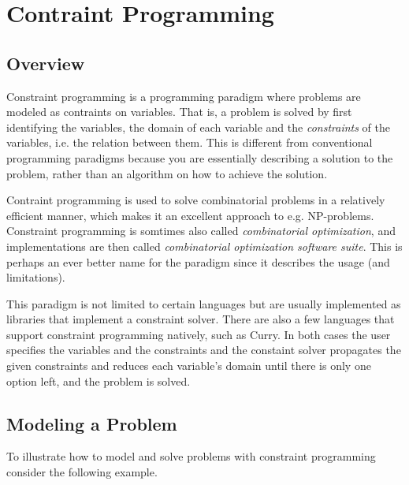 \section{Contraint Programming}

\subsection{Overview}

Constraint programming is a programming paradigm where problems are modeled as contraints
on variables. That is, a problem is solved by first identifying the variables, the domain
of each variable and the \textit{constraints} of the variables, i.e. the relation between them.
This is different from conventional programming paradigms because you are essentially
describing a solution to the problem, rather than an algorithm on how to achieve the solution.

Contraint programming is used to solve combinatorial problems in a relatively efficient
manner, which makes it an excellent approach to e.g. NP-problems. Constraint programming
is somtimes also called \textit{combinatorial optimization}, and implementations are then
called \textit{combinatorial optimization software suite}. This is perhaps an ever better
name for the paradigm since it describes the usage (and limitations).

This paradigm is not limited to certain languages but are usually implemented as libraries
that implement a constraint solver. There are also a few languages that support constraint
programming natively, such as Curry.
In both cases the user specifies the variables and
the constraints and the constaint solver propagates the given constraints and reduces each
variable's domain until there is only one option left, and the problem is solved.

\subsection{Modeling a Problem}

To illustrate how to model and solve problems with constraint programming consider the
following example.


